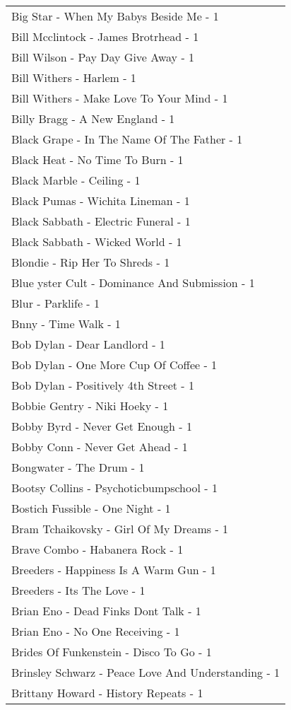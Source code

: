 \documentclass[
]{article}
\begin{document}
\begin{longtable}{l}
Big Star - When My Babys Beside Me - 1 \\ 
Bill Mcclintock - James Brotrhead - 1 \\ 
Bill Wilson - Pay Day Give Away - 1 \\ 
Bill Withers - Harlem - 1 \\ 
Bill Withers - Make Love To Your Mind - 1 \\ 
Billy Bragg - A New England - 1 \\ 
Black Grape - In The Name Of The Father - 1 \\ 
Black Heat - No Time To Burn - 1 \\ 
Black Marble - Ceiling - 1 \\ 
Black Pumas - Wichita Lineman - 1 \\ 
Black Sabbath - Electric Funeral - 1 \\ 
Black Sabbath - Wicked World - 1 \\ 
Blondie - Rip Her To Shreds - 1 \\ 
Blue yster Cult - Dominance And Submission - 1 \\ 
Blur - Parklife - 1 \\ 
Bnny - Time Walk - 1 \\ 
Bob Dylan - Dear Landlord - 1 \\ 
Bob Dylan - One More Cup Of Coffee - 1 \\ 
Bob Dylan - Positively 4th Street - 1 \\ 
Bobbie Gentry - Niki Hoeky - 1 \\ 
Bobby Byrd - Never Get Enough - 1 \\ 
Bobby Conn - Never Get Ahead - 1 \\ 
Bongwater - The Drum - 1 \\ 
Bootsy Collins - Psychoticbumpschool - 1 \\ 
Bostich Fussible - One Night - 1 \\ 
Bram Tchaikovsky - Girl Of My Dreams - 1 \\ 
Brave Combo - Habanera Rock - 1 \\ 
Breeders - Happiness Is A Warm Gun - 1 \\ 
Breeders - Its The Love - 1 \\ 
Brian Eno - Dead Finks Dont Talk - 1 \\ 
Brian Eno - No One Receiving - 1 \\ 
Brides Of Funkenstein - Disco To Go - 1 \\ 
Brinsley Schwarz - Peace Love And Understanding - 1 \\ 
Brittany Howard - History Repeats - 1 \\ 

\end{longtable}
\end{document}
